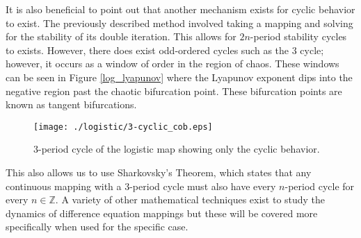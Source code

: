 It is also beneficial to point out that another mechanism exists for cyclic behavior to exist. The previously described method involved taking a mapping and solving for the stability of its double iteration. This allows for $2n$-period stability cycles to exists. However, there does exist odd-ordered cycles such as the $3$ cycle; however, it occurs as a window of order in the region of chaos. These windows can be seen in Figure \ref{log_lyapunov} where the Lyapunov exponent dips into the negative region past the chaotic bifurcation point. These bifurcation points are known as tangent bifurcations.
\begin{figure}
    \centering
    \texttt{[image: ./logistic/3-cyclic\_cob.eps]}
    \caption{3-period cycle of the logistic map showing only the cyclic behavior.}
    \label{log_3-cyclic_cob}
\end{figure}
This also allows us to use Sharkovsky's Theorem, which states that any continuous mapping with a 3-period cycle must also have every $n$-period cycle for every $n\in\mathbb{Z}$.\autocite{Puu2003} A variety of other mathematical techniques exist to study the dynamics of difference equation mappings but these will be covered more specifically when used for the specific case. 



